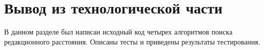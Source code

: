 \section*{Вывод из технологической части}

В данном разделе был написан исходный код четырех алгоритмов поиска редакционного расстояния. 
Описаны тесты и приведены результаты тестирования.
